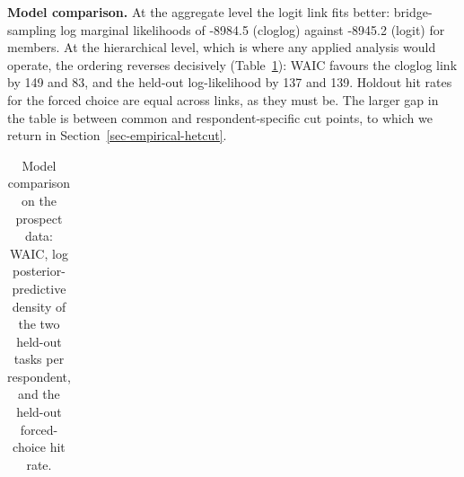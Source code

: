 \documentclass[
  letterpaper,
  DIV=11,
  numbers=noendperiod]{scrartcl}
\theoremstyle{plain}
\theoremstyle{plain}
\theoremstyle{plain}
\theoremstyle{remark}
\begin{document}
\textbf{Model comparison.} At the aggregate level the logit link fits
better: bridge-sampling log marginal likelihoods of -8984.5 (cloglog)
against -8945.2 (logit) for members. At the hierarchical level, which is
where any applied analysis would operate, the ordering reverses
decisively (Table~\ref{tbl-emp-compare}): WAIC favours the cloglog link
by 149 and 83, and the held-out log-likelihood by 137 and 139. Holdout
hit rates for the forced choice are equal across links, as they must be.
The larger gap in the table is between common and respondent-specific
cut points, to which we return in Section~\ref{sec-empirical-hetcut}.

\begin{longtable}[]{@{}
  >{\raggedright\arraybackslash}p{}
  >{\raggedright\arraybackslash}p{}
  >{\raggedright\arraybackslash}p{}
  >{\raggedright\arraybackslash}p{}
  >{\raggedright\arraybackslash}p{}@{}}

\caption{\label{tbl-emp-compare}Model comparison on the prospect data:
WAIC, log posterior-predictive density of the two held-out tasks per
respondent, and the held-out forced-choice hit rate.}

\tabularnewline


\end{longtable}
\end{document}
